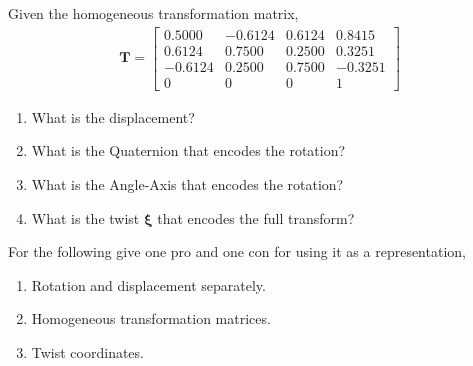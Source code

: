 \documentclass[12pt]{article}
\newenvironment{problem}[2][Problem]{\begin{trivlist}
\item[\hskip \labelsep {\bfseries #1}\hskip \labelsep {\bfseries #2.}]}{\end{trivlist}}
\begin{document}
\begin{problem}{2}%
Given the homogeneous transformation matrix, 
\begin{align*}
        \boldsymbol{T} = \begin{bmatrix}
        0.5000 & -0.6124 & 0.6124 & 0.8415 \\
        0.6124 & 0.7500 & 0.2500 & 0.3251 \\
        -0.6124 & 0.2500 & 0.7500 & -0.3251\\
        0 & 0 & 0 & 1
        \end{bmatrix}
\end{align*}
\begin{enumerate}[label=(\alph*)]
    \item What is the displacement?
    \item What is the Quaternion that encodes the rotation?
    \item What is the Angle-Axis that encodes the rotation?
    \item What is the twist $\boldsymbol{\xi}$ that encodes the full transform?
\end{enumerate}
 
\end{problem}

\begin{problem}{3}%
For the following give one pro and one con for using it as a representation,
\begin{enumerate}[label=(\alph*)]
    \item Rotation and displacement separately.
    \item Homogeneous transformation matrices.
    \item Twist coordinates.
\end{enumerate}
 
\end{problem}
\end{document}
